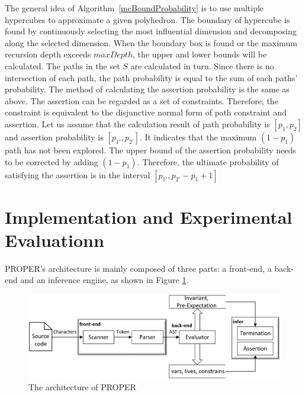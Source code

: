 \documentclass[runningheads]{llncs}
\begin{document}
The general idea of Algorithm~\ref{mcBoundProbability} is to use multiple hypercubes to approximate a given polyhedron. The boundary of hypercube is found by continuously selecting the most influential dimension and decomposing along the selected dimension. When the boundary box is found or the maximum recursion depth exceeds $maxDepth$, the upper and lower bounds will be calculated.
The paths in the set $S$ are calculated in turn. Since there is no intersection of each path, the path probability is equal to the sum of each paths' probability. The method of calculating the assertion probability is the same as above. The assertion can be regarded as a set of constraints. Therefore, the constraint is equivalent to the disjunctive normal form of path constraint and assertion.
Let us assume that the calculation result of path probability is $[p_1,p_2]$ and assertion probability is $[p_{1'},p_{2'}]$. It indicates that the maximum $(1-p_1)$ path has not been explored. The upper bound of the assertion probability needs to be corrected by adding $(1-p_1)$. Therefore, the ultimate probability of satisfying the assertion is in the interval $[p_{1'},p_{2'}-p_1+1]$


\section{Implementation and Experimental Evaluationn}
PROPER's architecture is mainly composed of three parts: a front-end, a back-end and an inference engine, as shown in Figure \ref{architecture}.  
\begin{figure}[htbp]
	\centering
	\includegraphics[scale=0.6]{img/architecture}
	\caption{The architecture of PROPER}
	\label{architecture}
\end{figure}
\end{document}
